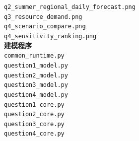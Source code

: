 {\begin{minipage}{0.93\textwidth}
\texttt{q2\_summer\_regional\_daily\_forecast.png}\\[-0.45em]
\texttt{q3\_resource\_demand.png}\\[-0.45em]
\texttt{q4\_scenario\_compare.png}\\[-0.45em]
\texttt{q4\_sensitivity\_ranking.png}\\[-0.45em]
\textbf{建模程序}\\[-0.45em]
\texttt{common\_runtime.py}\\[-0.45em]
\texttt{question1\_model.py}\\[-0.45em]
\texttt{question2\_model.py}\\[-0.45em]
\texttt{question3\_model.py}\\[-0.45em]
\texttt{question4\_model.py}\\[-0.45em]
\texttt{question1\_core.py}\\[-0.45em]
\texttt{question2\_core.py}\\[-0.45em]
\texttt{question3\_core.py}\\[-0.45em]
\texttt{question4\_core.py}\\[-0.45em]
\end{minipage}}
